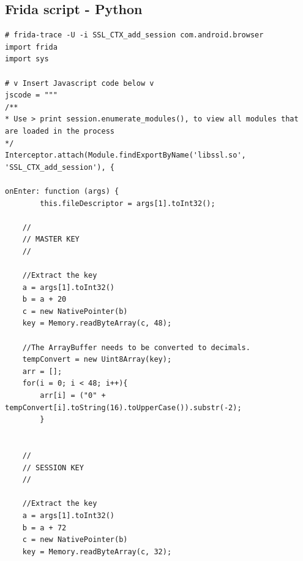 \documentclass[12pt, a4paper]{report}
\begin{document}
\begin{appendices}
 


\section{Frida script - Python}

\begin{lstlisting}[frame=single, breaklines=true]
# frida-trace -U -i SSL_CTX_add_session com.android.browser
import frida
import sys
 
# v Insert Javascript code below v
jscode = """
/**
* Use > print session.enumerate_modules(), to view all modules that are loaded in the process
*/ 
Interceptor.attach(Module.findExportByName('libssl.so', 'SSL_CTX_add_session'), {
 
onEnter: function (args) { 	
        this.fileDescriptor = args[1].toInt32();
 
	// 
	// MASTER KEY
	// 
 
	//Extract the key
	a = args[1].toInt32()
	b = a + 20
	c = new NativePointer(b)
	key = Memory.readByteArray(c, 48);
 
	//The ArrayBuffer needs to be converted to decimals. 
	tempConvert = new Uint8Array(key);
	arr = [];
	for(i = 0; i < 48; i++){
		arr[i] = ("0" + tempConvert[i].toString(16).toUpperCase()).substr(-2);
		}
 
 
	//
	// SESSION KEY
	//
 
	//Extract the key
	a = args[1].toInt32()
	b = a + 72
	c = new NativePointer(b)
	key = Memory.readByteArray(c, 32);
 

\end{lstlisting}
\end{appendices}
\end{document}
